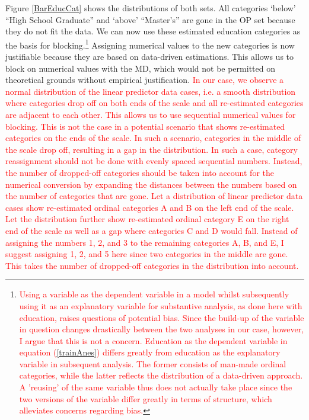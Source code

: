 \documentclass[12pt,econ]{sources/authesis}
\begin{document}
Figure \ref{BarEducCat} shows the distributions of both sets. All categories `below' ``High School Graduate'' and `above' ``Master's'' are gone in the OP set because they do not fit the data. We can now use these estimated education categories as the basis for blocking.\footnote{\textcolor{red}{Using a variable as the dependent variable in a model whilst subsequently using it as an explanatory variable for substantive analysis, as done here with education, raises questions of potential bias. Since the build-up of the variable in question changes drastically between the two analyses in our case, however, I argue that this is not a concern. Education as the dependent variable in equation (\ref{trainAnes}) differs greatly from education as the explanatory variable in subsequent analysis. The former consists of man-made ordinal categories, while the latter reflects the distribution of a data-driven approach. A 'reusing' of the same variable thus does not actually take place since the two versions of the variable differ greatly in terms of structure, which alleviates concerns regarding bias.}} Assigning numerical values to the new categories is now justifiable because they are based on data-driven estimations. This allows us to block on numerical values with the MD, which would not be permitted on theoretical grounds without empirical justification. \textcolor{red}{In our case, we observe a normal distribution of the linear predictor data cases, i.e. a smooth distribution where categories drop off on both ends of the scale and all re-estimated categories are adjacent to each other. This allows us to use sequential numerical values for blocking. This is not the case in a potential scenario that shows re-estimated categories on the ends of the scale. In such a scenario, categories in the middle of the scale drop off, resulting in a gap in the distribution. In such a case, category reassignment should not be done with evenly spaced sequential numbers. Instead, the number of dropped-off categories should be taken into account for the numerical conversion by expanding the distances between the numbers based on the number of categories that are gone. Let a distribution of linear predictor data cases show re-estimated ordinal categories A and B on the left end of the scale. Let the distribution further show re-estimated ordinal category E on the right end of the scale as well as a gap where categories C and D would fall. Instead of assigning the numbers 1, 2, and 3 to the remaining categories A, B, and E, I suggest assigning 1, 2, and 5 here since two categories in the middle are gone. This takes the number of dropped-off categories in the distribution into account.}
\end{document}
